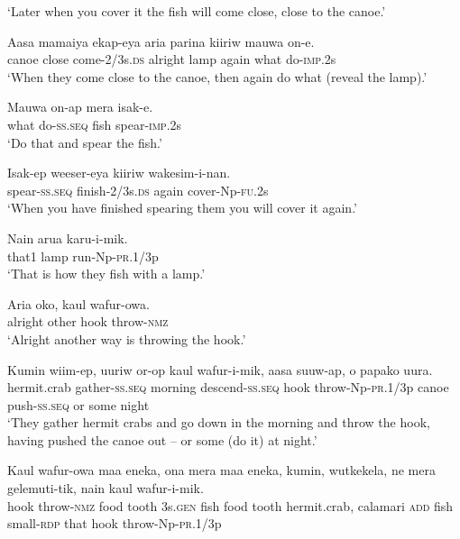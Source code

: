 \glt ‘Later when you cover it the fish will come close, close to the canoe.’ \\
\z


\ea
\gll  Aasa  mamaiya  ekap-eya  aria  parina  kiiriw    mauwa  on-e. \\
canoe  close  come-2/3s.\textsc{ds}  alright  lamp  again       what  do-\textsc{imp}.2s \\


\glt ‘When they come close to the canoe, then again do what (reveal the lamp).’ \\
\z


\ea
\gll  Mauwa  on-ap  mera  isak-e. \\
what  do-\textsc{ss.seq}  fish  spear-\textsc{imp}.2s \\
\glt ‘Do that and spear the fish.’ \\
\z


\ea
\gll  Isak-ep  weeser-eya  kiiriw  wakesim-i-nan. \\
spear-\textsc{ss.seq}  finish-2/3s.\textsc{ds}  again  cover-Np-\textsc{fu}.2s \\
\glt ‘When you have finished spearing them you will cover it again.’ \\
\z


\ea
\gll  Nain  arua  karu-i-mik. \\
that1  lamp  run-Np-\textsc{pr}.1/3p \\
\glt ‘That is how they fish with a lamp.’ \\
\z


\ea
\gll  Aria  oko,  kaul  wafur-owa. \\
alright  other  hook  throw-\textsc{nmz} \\
\glt ‘Alright another way is throwing the hook.’ \\
\z


\ea
\gll  Kumin  wiim-ep,  uuriw  or-op  kaul                   wafur-i-mik,  aasa  suuw-ap,  o  papako  uura. \\
hermit.crab  gather-\textsc{ss.seq}  morning  descend-\textsc{ss.seq}  hook   throw-Np-\textsc{pr}.1/3p  canoe  push-\textsc{ss.seq}  or  some  night \\


\glt ‘They gather hermit crabs and go down in the morning and throw the hook, having pushed the canoe out – or some (do it) at night.’ \\
\z


\ea
\gll  Kaul  wafur-owa  maa  eneka,  ona  mera  maa  eneka,   kumin,  wutkekela,  ne  mera  gelemuti-tik,        nain  kaul  wafur-i-mik. \\
hook  throw-\textsc{nmz}  food  tooth  3s.\textsc{gen}  fish  food  tooth      hermit.crab,  calamari  \textsc{add}  fish  small-\textsc{rdp}       that  hook  throw-Np-\textsc{pr}.1/3p \\




